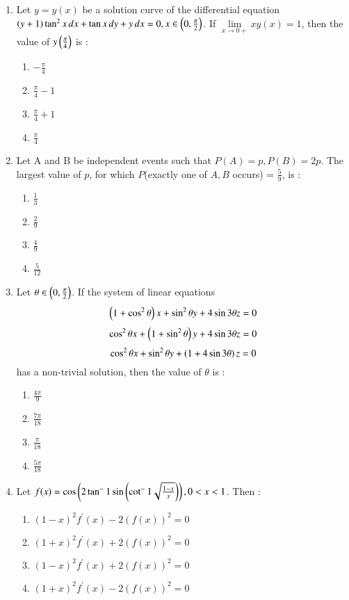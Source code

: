 \documentclass[journal,12pt,twocolumn]{IEEEtran}
\theoremstyle{remark}
\begin{document}
\begin{enumerate}
    \item Let $y=y(x)$ be a solution curve of the differential equation $(y+1)\tan^2{x}\,dx + \tan{x}\,dy + y\,dx=0, x\in\left(0,\frac{\pi}{2}\right)$. If $\lim\limits_{x\to0+}xy(x)=1$, then the value of $y\left(\frac{\pi}{4}\right)$ is :
        \begin{enumerate}
            \item $-\frac{\pi}{4}$
            \item $\frac{\pi}{4}-1$
            \item $\frac{\pi}{4}+1$
            \item $\frac{\pi}{4}$
        \end{enumerate}

    \item Let A and B be independent events such that $P(A) = p, P(B) = 2p$. The largest value of $p$, for which $P$(exactly one of $A, B$ occurs) = $\frac{5}{9}$, is :
        \begin{enumerate}
            \item $\frac{1}{3}$
            \item $\frac{2}{9}$
            \item $\frac{4}{9}$
            \item $\frac{5}{12}$
        \end{enumerate}

    \item Let $\theta\in\left(0,\frac{\pi}{2}\right)$. If the system of linear equations
            $$\left(1+\cos^2{\theta}\right)x+\sin^2{\theta}y+4\sin{3\theta}z=0$$
            $$\cos^2{\theta}x+\left(1+\sin^2{\theta}\right)y+4\sin{3\theta}z=0$$
            $$\cos^2{\theta}x+\sin^2{\theta}y+\left(1+4\sin{3\theta}\right)z=0$$
        has a non-trivial solution, then the value of $\theta$ is :
        \begin{enumerate}
            \item $\frac{4\pi}{9}$
            \item $\frac{7\pi}{18}$
            \item $\frac{\pi}{18}$
            \item $\frac{5\pi}{18}$
        \end{enumerate}

    \item Let $f(x)=\cos\left(2\tan^-1\sin\left(\cot^-1\sqrt{\frac{1-x}{x}}\right)\right), 0<x<1$. Then :
        \begin{enumerate}
            \item $(1-x)^2f^\prime(x)-2(f(x))^2=0$
            \item $(1+x)^2f^\prime(x)+2(f(x))^2=0$
            \item $(1-x)^2f^\prime(x)+2(f(x))^2=0$
            \item $(1+x)^2f^\prime(x)-2(f(x))^2=0$
        \end{enumerate}



\end{enumerate}
\end{document}
